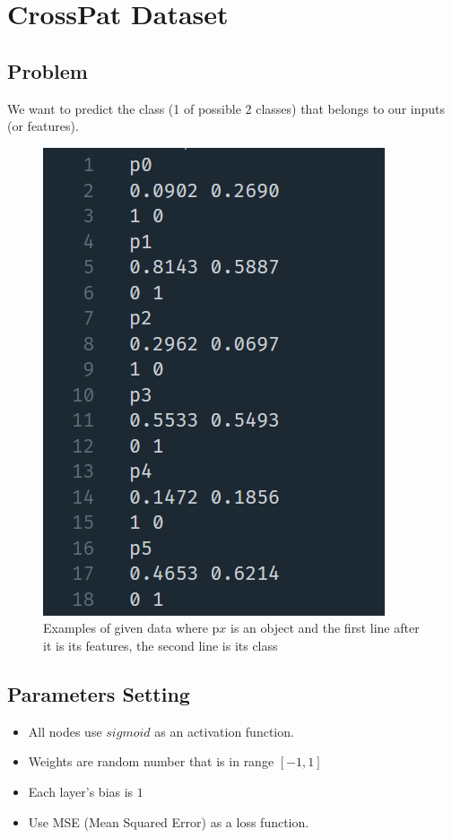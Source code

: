 \documentclass{article}
\begin{document}
\section*{CrossPat Dataset}
\subsection*{Problem}
We want to predict the class (1 of possible 2 classes) that belongs
to our inputs (or features).

\begin{figure}[ht]
	\centering
	\includegraphics[scale=0.5]{cross_data}
	\caption{Examples of given data where p$x$ is an object and 
	the first line after it is its features, the second line is its class}
\end{figure}
\FloatBarrier

\subsection*{Parameters Setting}
\begin{itemize}
	\item All nodes use $sigmoid$ as an activation function.
	\item Weights are random number that is in range $[-1, 1]$
	\item Each layer's bias is $1$
	\item Use MSE (Mean Squared Error) as a loss function.
\end{itemize}
\end{document}
